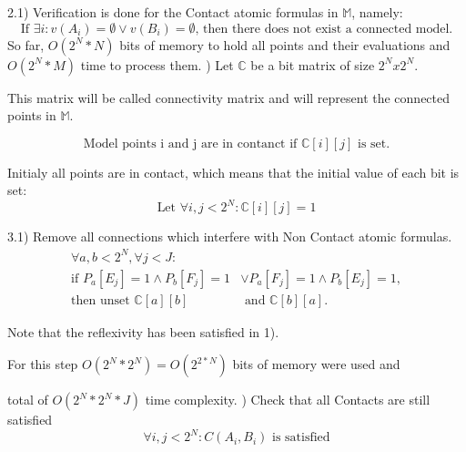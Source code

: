 \documentclass{article}
\begin{document}
		2.1) Verification is done for the Contact atomic formulas in $\mathbb{M}$, namely:
			\begin{equation}
				\text{If  } \exists i: v(A_i) = \emptyset \vee v(B_i) = \emptyset \text{, then there does not exist a connected model.}
			\end{equation}
			\newline
		So far, $O(2^N * N)$ bits of memory to hold all points and 
		their evaluations and $O(2^N * M)$ time to process them.
			\newline
			) Let $\mathbb{C}$ be a bit matrix of size $2^N x 2^N$.
			\newline
			
			This matrix will be called connectivity matrix and will represent the connected points in $\mathbb{M}$.
			
			\begin{equation}
				\text{Model points i and j are in contanct if } \mathbb{C}[ i ][ j ] \text{ is set.}
			\end{equation}

			Initialy all points are in contact, which means that the initial value of each bit is set:
			\begin{equation}
				\text{Let } \forall i, j < 2^N : \mathbb{C}[ i ][ j ] = 1
			\end{equation}
	
			3.1) Remove all connections which interfere with Non Contact atomic formulas.
				\begin{align*}
					\forall a, b < 2^N, \forall j < J :& \\
						\text{if } P_a [E_j] = 1 \wedge P_b [F_j] = 1 &\vee P_a[F_j] = 1 \wedge P_b[E_j] = 1, \\
						\text{then unset } \mathbb{C}[a][b] &\text{ and } \mathbb{C}[b][a].
				\end{align*} 
				
			Note that the reflexivity has been satisfied in 1).
			\newline

			For this step $O(2^N * 2^N) = O(2^{2*N})$ bits of memory were used and 

			total of $O(2^N * 2^N * J)$ time complexity.
			\newline
			) Check that all Contacts are still satisfied
			\begin{equation}
				\forall i, j < 2^N: C(A_i, B_i) \text{ is satisfied}
			\end{equation}
			
\end{document}
